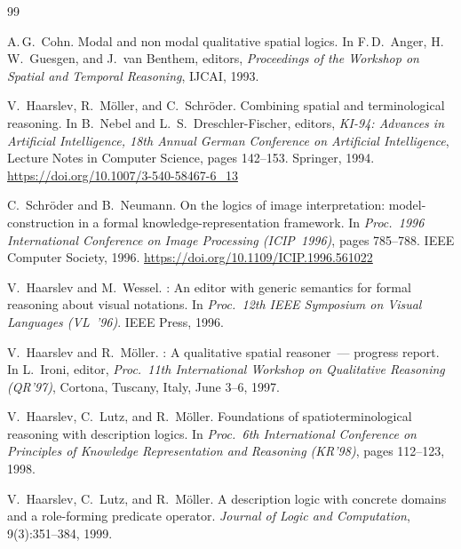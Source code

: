 \documentclass[
]{ceurart}
\theoremstyle{definition}
\begin{document}
\begin{thebibliography}{99}


A.\,G.\ Cohn.
\newblock Modal and non modal qualitative spatial logics.
\newblock In F.\,D.\ Anger, H.\,W.\ Guesgen, and J.\ van Benthem, editors,
  \emph{Proceedings of the Workshop on Spatial and Temporal Reasoning},
  IJCAI, 1993.

 V.\ Haarslev, R.\ M\"oller, and
  C.\ Schr\"oder.  \newblock Combining spatial and terminological
  reasoning.  \newblock In B.\ Nebel and L.\ S.\ Dreschler-Fischer,
  editors, \emph{KI-94: Advances in Artificial Intelligence, 18th
  Annual German Conference on Artificial Intelligence}, Lecture Notes
  in Computer Science, pages 142--153. Springer, 1994.  \newblock
  \url{https://doi.org/10.1007/3-540-58467-6_13}

 C.\ Schr\"oder and B.\ Neumann.
  \newblock On the logics of image interpretation: model-construction
  in a formal knowledge-representation framework.  \newblock In
  \emph{Proc.\ 1996 International Conference on Image Processing
  (ICIP~1996)}, pages 785--788. IEEE Computer Society, 1996.
  \newblock \url{https://doi.org/10.1109/ICIP.1996.561022}

 V.\ Haarslev and M.\ Wessel.
  : An editor with generic semantics for formal
  reasoning about visual notations.  \newblock In \emph{Proc.\ 12th
  IEEE Symposium on Visual Languages (VL~'96)}. IEEE Press, 1996.

 V.\ Haarslev and R.\ M\"oller.
  : A qualitative spatial reasoner~--- progress
  report.  \newblock In L.\ Ironi, editor, \emph{Proc.\ 11th
  International Workshop on Qualitative Reasoning (QR'97)}, Cortona,
  Tuscany, Italy, June 3--6, 1997.

 V.\ Haarslev, C.\ Lutz, and
  R.\ M\"oller.  \newblock Foundations of spatioterminological
  reasoning with description logics.  \newblock In \emph{Proc.\ 6th
  International Conference on Principles of Knowledge Representation
  and Reasoning (KR'98)}, pages 112--123, 1998.

 V.\ Haarslev, C.\ Lutz, and
  R.\ M\"oller.  \newblock A description logic with concrete domains
  and a role-forming predicate operator.  \newblock \emph{Journal of
  Logic and Computation}, 9(3):351--384, 1999.


\end{thebibliography}
\end{document}
